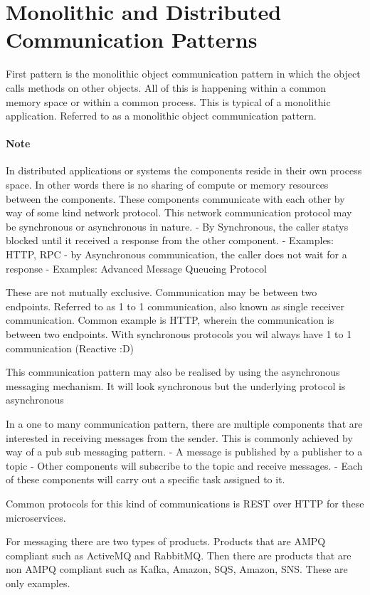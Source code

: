 \documentclass[a4paper, 11pt]{book}
\begin{document}
    \section{Monolithic and Distributed Communication Patterns}
    First pattern is the monolithic object communication pattern in which the object calls methods on other objects.
    All of this is happening within a common memory space or within a common process.
    This is typical of a monolithic application.
    Referred to as a monolithic object communication pattern.

    \paragraph{Note}
    In distributed applications or systems the components reside in their own process space.
    In other words there is no sharing of compute or memory resources between the components.
    These components communicate with each other by way of some kind network protocol.
    This network communication protocol may be synchronous or asynchronous in nature.
    - By Synchronous, the caller statys blocked until it received a response from the other component.
    - Examples: HTTP, RPC
    - by Asynchronous communication, the caller does not wait for a response
    - Examples: Advanced Message Queueing Protocol

    These are not mutually exclusive.
    Communication may be between two endpoints.
    Referred to as 1 to 1 communication, also known as single receiver communication.
    Common example is HTTP, wherein the communication is between two endpoints.
    With synchronous protocols you wil always have 1 to 1 communication (Reactive :D)

    This communication pattern may also be realised by using the asynchronous messaging mechanism.
    It will look synchronous but the underlying protocol is asynchronous

    In a one to many communication pattern, there are multiple components that are interested in receiving messages from the sender.
    This is commonly achieved by way of a pub sub messaging pattern.
    - A message is published by a publisher to a topic
    - Other components will subscribe to the topic and receive messages.
    - Each of these components will carry out a specific task assigned to it.

    Common protocols for this kind of communications is REST over HTTP for these microservices.

    For messaging there are two types of products. Products that are AMPQ compliant such as ActiveMQ and RabbitMQ.
    Then there are products that are non AMPQ compliant such as Kafka, Amazon, SQS, Amazon, SNS. These are only examples.
\end{document}
